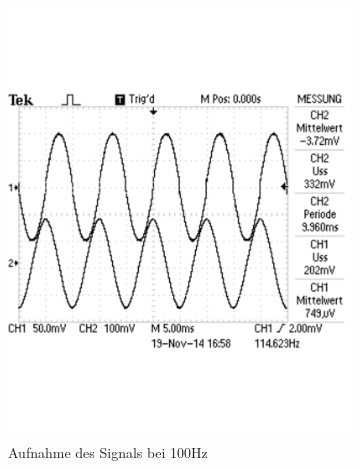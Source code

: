 \documentclass[12pt,a4paper]{article}
\begin{document}
\begin{figure}[H]
        \centering
        \begin{subfigure}[b]{0.28\textwidth}
                \includegraphics[width=\textwidth , scale = 0.4]{2_5_sin_100.pdf}
                \caption[Aufnahme des Signals bei 100Hz]{Aufnahme des Signals bei 100Hz}
                \label{fig:2_5_sin_100}
        \end{subfigure}%
        \hfill
        \begin{subfigure}[b]{0.28\textwidth}

\end{subfigure}
\end{figure}
\end{document}
